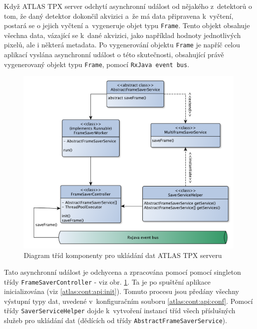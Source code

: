 Když ATLAS TPX server odchytí asynchronní událost od nějakého z~detektorů o tom, že daný detektor dokončil akvizici a~že má data připravena k~vyčtení, postará se o jejich vyčtení a~vygeneruje objet typu \texttt{Frame}. Tento objekt obsahuje všechna data, vázající se k~dané akvizici, jako například hodnoty jednotlivých pixelů, ale i některá metadata. Po vygenerování objektu \texttt{Frame} je napříč celou aplikací vyslána asynchronní událost o této skutečnosti, obsahující právě vygenerovaný objekt typu \texttt{Frame}, pomocí \texttt{RxJava event bus}.

\begin{figure}[t]
	\begin{center}
		\includegraphics[width=15cm]{figures/atlas_tpx_saver_service.pdf}
		\caption{Diagram tříd komponenty pro ukládání dat ATLAS TPX serveru}
		\label{fig:atlas:saver-service}
	\end{center}
\end{figure}

Tato asynchronní událost je odchycena a zpracována pomocí pomocí singleton třídy \texttt{FrameSaverController} - viz obr. \ref{fig:atlas:saver-service}. Ta je po spuštění aplikace inicializována (viz \ref{atlas:cont:api:init}). Tomuto procesu jsou předány všechny výstupní typy dat, uvedené v~konfiguračním souboru \ref{atlas:cont:api:conf}. Pomocí třídy \texttt{SaverServiceHelper} dojde k~vytvoření instancí tříd všech příslušných služeb pro ukládání dat (dědících od třídy \texttt{AbstractFrameSaverService}).

